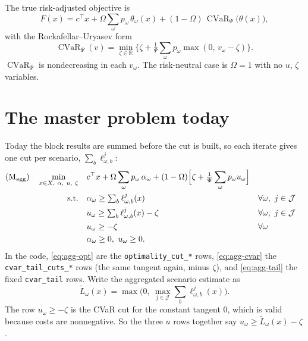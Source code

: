 \documentclass[11pt]{article}
\theoremstyle{remark}
\newcommand{\J}{\mathcal{J}}
\newcommand{\Lt}{\widetilde{L}}
\newcommand{\CVaR}{\operatorname{CVaR}}
\begin{document}
\noindent The true risk-adjusted objective is
\begin{equation}
  F(x) = c^\top x + \Omega \sum_{\omega} p_\omega\, \theta_\omega(x)
         + (1-\Omega)\, \CVaR_\Psi\!\big(\theta(x)\big),
\end{equation}
with the Rockafellar--Uryasev form
\begin{equation}
  \CVaR_\Psi(v) = \min_{\zeta \in \mathbb{R}} \Big\{ \zeta + \tfrac{1}{\Psi}\sum_\omega p_\omega
  \max(0,\, v_\omega - \zeta) \Big\}.
\end{equation}
$\CVaR_\Psi$ is nondecreasing in each $v_\omega$. The risk-neutral case is $\Omega = 1$ with no
$u$, $\zeta$ variables.

\section{The master problem today}

Today the block results are summed before the cut is built, so each iterate gives one cut per
scenario, $\sum_b \ell^j_{\omega,b}$:
\begin{align}
  \text{(M\textsubscript{agg})}\quad
  \min_{x\in X,\ \alpha,\ u,\ \zeta}\quad
    & c^\top x + \Omega \sum_\omega p_\omega\, \alpha_\omega
      + (1-\Omega)\Big[\zeta + \tfrac{1}{\Psi}\sum_\omega p_\omega u_\omega\Big] \notag\\
  \text{s.t.}\quad
    & \alpha_\omega \ge \textstyle\sum_b \ell^j_{\omega,b}(x)
      && \forall \omega,\ j \in \J \label{eq:agg-opt}\\
    & u_\omega \ge \textstyle\sum_b \ell^j_{\omega,b}(x) - \zeta
      && \forall \omega,\ j \in \J \label{eq:agg-cvar}\\
    & u_\omega \ge -\zeta && \forall \omega \label{eq:agg-tail}\\
    & \alpha_\omega \ge 0,\ u_\omega \ge 0. \notag
\end{align}
In the code, \eqref{eq:agg-opt} are the \texttt{optimality\_cut\_*} rows, \eqref{eq:agg-cvar} the
\texttt{cvar\_tail\_cuts\_*} rows (the same tangent again, minus $\zeta$), and \eqref{eq:agg-tail} the
fixed \texttt{cvar\_tail} rows.
Write the aggregated scenario estimate as
\begin{equation}
  \Lt_\omega(x) = \max\Big(0,\ \max_{j\in\J} \sum_{b} \ell^j_{\omega,b}(x)\Big).
\end{equation}
The row $u_\omega \ge -\zeta$ is the CVaR cut for the constant tangent $0$, which is valid because
costs are nonnegative. So the three $u$ rows together say $u_\omega \ge \Lt_\omega(x) - \zeta$.
\end{document}
